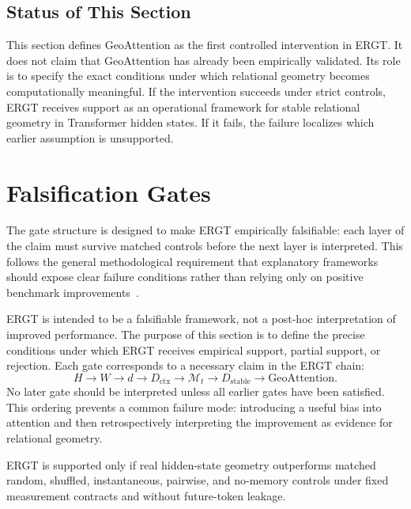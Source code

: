 \documentclass[11pt]{article}
\begin{document}
\subsection{Status of This Section}

This section defines GeoAttention as the first controlled intervention in ERGT. It does not claim that GeoAttention has already been empirically validated. Its role is to specify the exact conditions under which relational geometry becomes computationally meaningful. If the intervention succeeds under strict controls, ERGT receives support as an operational framework for stable relational geometry in Transformer hidden states. If it fails, the failure localizes which earlier assumption is unsupported.

\setcounter{section}{8}
\section{Falsification Gates}
\noindent The gate structure is designed to make ERGT empirically falsifiable: each layer of the claim must survive matched controls before the next layer is interpreted. This follows the general methodological requirement that explanatory frameworks should expose clear failure conditions rather than relying only on positive benchmark improvements~\cite{popper1959logic}.

\label{sec:falsification-gates}

ERGT is intended to be a falsifiable framework, not a post-hoc interpretation of improved performance. The purpose of this section is to define the precise conditions under which ERGT receives empirical support, partial support, or rejection. Each gate corresponds to a necessary claim in the ERGT chain:
\[
H
\rightarrow
W
\rightarrow
d
\rightarrow
D_{\mathrm{ctx}}
\rightarrow
\mathcal{M}_t
\rightarrow
D_{\mathrm{stable}}
\rightarrow
\mathrm{GeoAttention}.
\]
No later gate should be interpreted unless all earlier gates have been satisfied. This ordering prevents a common failure mode: introducing a useful bias into attention and then retrospectively interpreting the improvement as evidence for relational geometry.

\begin{ergtclaim}
ERGT is supported only if real hidden-state geometry outperforms matched random, shuffled, instantaneous, pairwise, and no-memory controls under fixed measurement contracts and without future-token leakage.
\end{ergtclaim}
\end{document}
